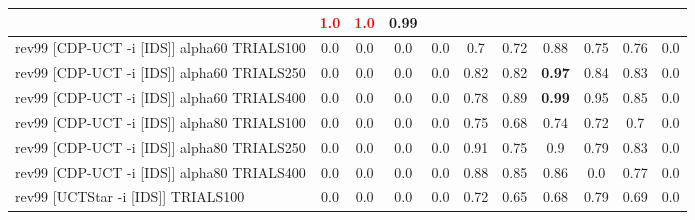 \documentclass{article}
\begin{document}
\begin{tabular}{|l|r@{$\pm$}rr@{$\pm$}rr@{$\pm$}rr@{$\pm$}rr@{$\pm$}rr@{$\pm$}rr@{$\pm$}rr@{$\pm$}rr@{$\pm$}rr@{$\pm$}r|}
& \multicolumn{2}{c}{\textbf{\textcolor{red}{1.0}}}
& \multicolumn{2}{c}{\textbf{\textcolor{red}{1.0}}}
& \multicolumn{2}{c|}{0.99}
\\
\hline
rev99 [CDP-UCT -i [IDS]] alpha60 TRIALS100
& \multicolumn{2}{c}{0.0}
& \multicolumn{2}{c}{0.0}
& \multicolumn{2}{c}{0.0}
& \multicolumn{2}{c}{0.0}
& \multicolumn{2}{c}{0.7}
& \multicolumn{2}{c}{0.72}
& \multicolumn{2}{c}{0.88}
& \multicolumn{2}{c}{0.75}
& \multicolumn{2}{c}{0.76}
& \multicolumn{2}{c|}{0.0}
\\
rev99 [CDP-UCT -i [IDS]] alpha60 TRIALS250
& \multicolumn{2}{c}{0.0}
& \multicolumn{2}{c}{0.0}
& \multicolumn{2}{c}{0.0}
& \multicolumn{2}{c}{0.0}
& \multicolumn{2}{c}{0.82}
& \multicolumn{2}{c}{0.82}
& \multicolumn{2}{c}{\textbf{0.97}}
& \multicolumn{2}{c}{0.84}
& \multicolumn{2}{c}{0.83}
& \multicolumn{2}{c|}{0.0}
\\
rev99 [CDP-UCT -i [IDS]] alpha60 TRIALS400
& \multicolumn{2}{c}{0.0}
& \multicolumn{2}{c}{0.0}
& \multicolumn{2}{c}{0.0}
& \multicolumn{2}{c}{0.0}
& \multicolumn{2}{c}{0.78}
& \multicolumn{2}{c}{0.89}
& \multicolumn{2}{c}{\textbf{0.99}}
& \multicolumn{2}{c}{0.95}
& \multicolumn{2}{c}{0.85}
& \multicolumn{2}{c|}{0.0}
\\
rev99 [CDP-UCT -i [IDS]] alpha80 TRIALS100
& \multicolumn{2}{c}{0.0}
& \multicolumn{2}{c}{0.0}
& \multicolumn{2}{c}{0.0}
& \multicolumn{2}{c}{0.0}
& \multicolumn{2}{c}{0.75}
& \multicolumn{2}{c}{0.68}
& \multicolumn{2}{c}{0.74}
& \multicolumn{2}{c}{0.72}
& \multicolumn{2}{c}{0.7}
& \multicolumn{2}{c|}{0.0}
\\
rev99 [CDP-UCT -i [IDS]] alpha80 TRIALS250
& \multicolumn{2}{c}{0.0}
& \multicolumn{2}{c}{0.0}
& \multicolumn{2}{c}{0.0}
& \multicolumn{2}{c}{0.0}
& \multicolumn{2}{c}{0.91}
& \multicolumn{2}{c}{0.75}
& \multicolumn{2}{c}{0.9}
& \multicolumn{2}{c}{0.79}
& \multicolumn{2}{c}{0.83}
& \multicolumn{2}{c|}{0.0}
\\
rev99 [CDP-UCT -i [IDS]] alpha80 TRIALS400
& \multicolumn{2}{c}{0.0}
& \multicolumn{2}{c}{0.0}
& \multicolumn{2}{c}{0.0}
& \multicolumn{2}{c}{0.0}
& \multicolumn{2}{c}{0.88}
& \multicolumn{2}{c}{0.85}
& \multicolumn{2}{c}{0.86}
& \multicolumn{2}{c}{0.0}
& \multicolumn{2}{c}{0.77}
& \multicolumn{2}{c|}{0.0}
\\
rev99 [UCTStar -i [IDS]] TRIALS100
& \multicolumn{2}{c}{0.0}
& \multicolumn{2}{c}{0.0}
& \multicolumn{2}{c}{0.0}
& \multicolumn{2}{c}{0.0}
& \multicolumn{2}{c}{0.72}
& \multicolumn{2}{c}{0.65}
& \multicolumn{2}{c}{0.68}
& \multicolumn{2}{c}{0.79}
& \multicolumn{2}{c}{0.69}
& \multicolumn{2}{c|}{0.0}

\end{tabular}
\end{document}
